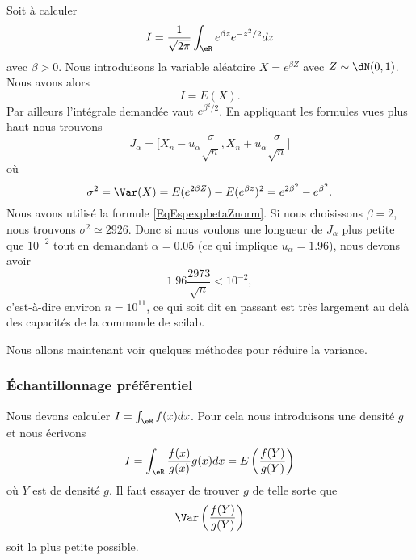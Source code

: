\begin{example}
	Soit à calculer
	\begin{equation}
		I=\frac{1}{ \sqrt{2\pi} }\int_{\eR} e^{\beta z} e^{-z^2/2}dz
	\end{equation}
	avec \( \beta>0\). Nous introduisons la variable aléatoire \( X= e^{\beta Z}\) avec \( Z\sim\dN(0,1)\). Nous avons alors
	\begin{equation}
		I=E(X).
	\end{equation}
	Par ailleurs l'intégrale demandée vaut \(  e^{\beta^2/2}\). En appliquant les formules vues plus haut nous trouvons
	\begin{equation}
		J_{\alpha}=\big[ \bar X_n-u_{\alpha}\frac{ \sigma }{ \sqrt{n} },\bar X_n+u_{\alpha}\frac{ \sigma }{ \sqrt{n} } \big]
	\end{equation}
	où
	\begin{equation}
		\sigma^2=\Var(X)=E( e^{2\beta Z})-E( e^{\beta z})^2= e^{2\beta^2}- e^{\beta^2}.
	\end{equation}
	Nous avons utilisé la formule \eqref{EqEspexpbetaZnorm}. Si nous choisissons \( \beta=2\), nous trouvons \( \sigma^2\simeq 2926\). Donc si nous voulons une longueur de \( J_{\alpha}\) plus petite que \( 10^{-2}\) tout en demandant \( \alpha=0.05\) (ce qui implique \( u_{\alpha}=1.96\)), nous devons avoir
	\begin{equation}
		1.96\frac{ 2973 }{ \sqrt{n} }<10^{-2},
	\end{equation}
	c'est-à-dire environ \( n=10^{11}\), ce qui soit dit en passant est très largement au delà des capacités de la commande de scilab\cite{BIBooMXHQooDAXmCz}.
\end{example}

Nous allons maintenant voir quelques méthodes pour réduire la variance.

\subsubsection{Échantillonnage préférentiel}

Nous devons calculer \( I=\int_{\eR}f(x)dx\). Pour cela nous introduisons une densité \( g\) et nous écrivons
\begin{equation}
	I=\int_{\eR}\frac{ f(x) }{ g(x) }g(x)dx=E\left( \frac{ f(Y) }{ g(Y) } \right)
\end{equation}
où \( Y\) est de densité \( g\). Il faut essayer de trouver \( g\) de telle sorte que
\begin{equation}
	\Var\left( \frac{ f(Y) }{ g(Y) } \right)
\end{equation}
soit la plus petite possible.

